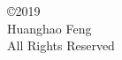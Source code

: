\newpage
\thispagestyle{empty}
\vspace*{7.5in}
\begin{center}
\copyright 2019\\
\vspace{0.1in}
Huanghao Feng\\
\vspace{0.1in}
All Rights Reserved\\
\end{center}
